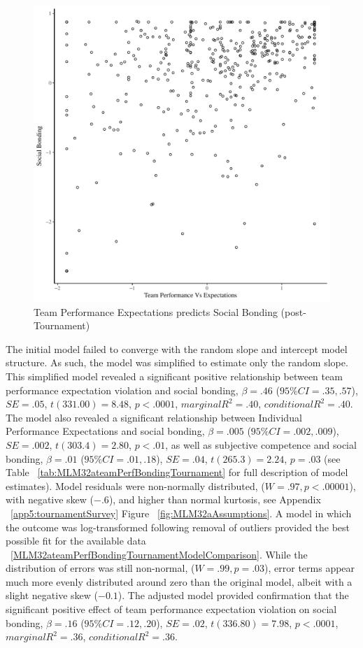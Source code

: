   \begin{figure}[htbp]
    \centering
  \includegraphics[scale=.5]{images/teamPerfBondOverallBasicXY.pdf}
    \caption{Team Performance Expectations predicts Social Bonding (post-Tournament)}
    \label{fig:teamPerfBondOverallBasicXY}
  \end{figure}


  The initial model failed to converge with the random slope and intercept model structure.  As such, the model was simplified to estimate only the random slope. This simplified model revealed a significant positive relationship between team performance expectation violation and social bonding, $\beta = .46$ ($95\% CI =  .35, .57$), $SE = .05$, $t(331.00) = 8.48$, $p < .0001$, $marginal R^2 = .40$, $conditional R^2 = .40$.
  The model also revealed a significant relationship between Individual Performance Expectations and social bonding, $\beta = .005$ ($95\% CI =  .002, .009$), $SE = .002$, $t(303.4) = 2.80$, $p < .01$, as well as subjective competence and social bonding, $\beta = .01$ ($95\% CI =  .01, .18$), $SE = .04$, $t(265.3) = 2.24$, $p = .03$ (see Table ~\ref{tab:MLM32ateamPerfBondingTournament} for full description of model estimates).  Model residuals were non-normally distributed, ($W = .97, p < .00001$), with negative skew ($-.6$), and higher than normal kurtosis, see Appendix ~\ref{app5:tournamentSurvey} Figure ~\ref{fig:MLM32aAssumptions}.  A model in which the outcome was log-transformed following removal of outliers provided the best possible fit for the available data ~\ref{MLM32ateamPerfBondingTournamentModelComparison}. While the distribution of errors was still non-normal, ($W = .99, p = .03$),  error terms appear much more evenly distributed around zero than the original model, albeit with a slight negative skew ($-0.1$).
  The adjusted model provided confirmation that the significant positive effect of team performance expectation violation on social bonding,  $\beta = .16$ ($95\% CI =  .12, .20$), $SE = .02$, $t(336.80) = 7.98$, $p < .0001$, $marginal R^2 = .36$, $conditional R^2 = .36$.

